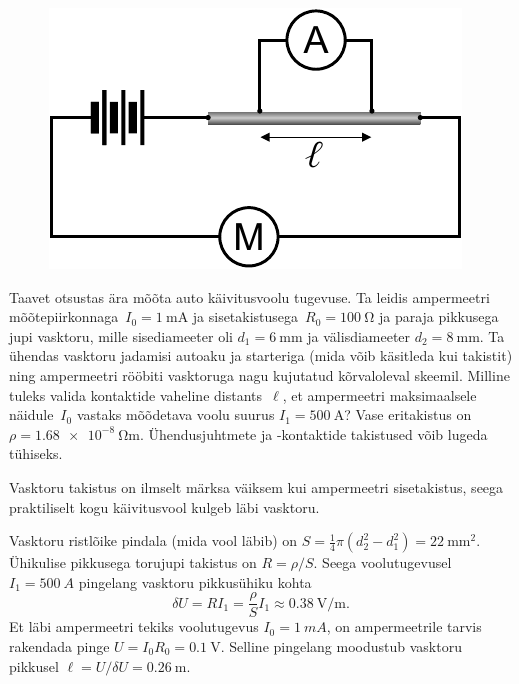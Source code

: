 \setAuthor{}

\begin{figure}
  \vspace{-25pt}
  \begin{center}
  \includegraphics[scale=0.6]{2020-v3g-03-yl.pdf}
  \vspace{-20pt}
  \end{center}
\end{figure}
Taavet otsustas ära mõõta auto käivitusvoolu tugevuse. Ta leidis ampermeetri
mõõtepiirkonnaga~$I_0=\SI{1}{\milli\ampere}$ ja sisetakistusega~$R_0=\SI{100}{\ohm}$
ja paraja pikkusega jupi vasktoru, mille sisediameeter oli
$d_1=\SI{6}{\milli\meter}$ ja välisdiameeter $d_2=\SI{8}{\milli\meter}$. Ta ühendas
vasktoru jadamisi autoaku ja starteriga (mida võib käsitleda kui takistit) ning ampermeetri rööbiti
vasktoruga nagu kujutatud kõrvaloleval skeemil. Milline tuleks
valida kontaktide vaheline distants~$\ell$, et ampermeetri maksimaalsele
näidule~$I_0$ vastaks mõõdetava voolu suurus $I_1=\SI{500}{\ampere}$?
Vase eritakistus on $\rho=\SI{1.68e-8}{\ohm\meter}$. Ühendusjuhtmete ja
-kontaktide takistused võib lugeda tühiseks.



\hint

\solu
Vasktoru takistus on ilmselt märksa väiksem kui ampermeetri sisetakistus, seega praktiliselt kogu käivitusvool kulgeb läbi vasktoru.

Vasktoru ristlõike pindala (mida vool läbib) on $S=\frac{1}{4}\pi(d_2^2-d_1^2)=\SI{22}{\milli\meter\squared}$. Ühikulise pikkusega torujupi takistus on $R=\rho/S$. Seega voolutugevusel $I_1=\SI{500}{A}$ pingelang vasktoru pikkusühiku kohta
\[
\delta U = RI_1 = \frac{\rho}{S}I_1\approx \SI{0.38}{\volt\per\meter}.
\]
Et läbi ampermeetri tekiks voolutugevus $I_0=\SI{1}{mA}$, on ampermeetrile tarvis rakendada pinge $U=I_0R_0=\SI{0.1}{\volt}$. Selline pingelang moodustub vasktoru pikkusel $\ell=U/\delta U=\SI{0.26}{\meter}$.
\probend